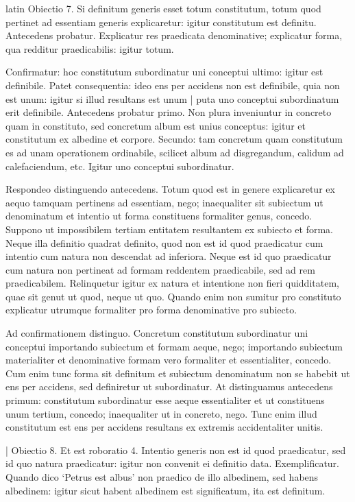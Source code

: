 \begin{otherlanguage*}{latin}
\pstart
  Obiectio 7. Si definitum generis esset totum constitutum, totum quod pertinet ad essentiam generis explicaretur: igitur constitutum est definitu. Antecedens probatur. Explicatur res praedicata denominative; explicatur forma, qua redditur praedicabilis: igitur totum. 
\pend

\pstart
  Confirmatur: hoc constitutum subordinatur uni conceptui ultimo: igitur est definibile. Patet consequentia: ideo ens per accidens non est definibile, quia non est unum: igitur si illud resultans est unum \textnormal{|} puta uno conceptui subordinatum erit definibile. Antecedens probatur primo. Non plura inveniuntur in concreto quam in constituto, sed concretum album est unius conceptus: igitur et constitutum ex albedine et corpore. Secundo: tam concretum quam constitutum es ad unam operationem ordinabile, scilicet album ad disgregandum, calidum ad calefaciendum, etc. Igitur uno conceptui subordinatur. 
\pend

\pstart
  Respondeo distinguendo antecedens. Totum quod est in genere explicaretur ex aequo tamquam pertinens ad essentiam, nego; inaequaliter  sit subiectum ut denominatum et intentio ut forma constituens formaliter genus, concedo. Suppono ut impossibilem tertiam entitatem resultantem ex subiecto et forma. Neque illa definitio quadrat definito, quod non est id quod praedicatur cum intentio cum natura non descendat ad inferiora. Neque est id quo praedicatur cum natura non pertineat ad formam reddentem praedicabile, sed ad rem praedicabilem. Relinquetur igitur ex natura et intentione non fieri quidditatem, quae sit genut ut quod, neque ut quo. Quando enim non sumitur pro constituto explicatur utrumque formaliter pro forma denominative pro subiecto. 
\pend

\pstart
  Ad confirmationem distinguo. Concretum constitutum subordinatur uni conceptui importando subiectum et formam aeque, nego; importando subiectum materialiter et denominative formam vero formaliter et essentialiter, concedo. Cum enim tunc forma sit definitum et subiectum denominatum non se habebit ut ens per accidens, sed definiretur ut subordinatur. At distinguamus antecedens primum: constitutum subordinatur esse aeque essentialiter et ut constituens unum tertium, concedo; inaequaliter ut in concreto, nego. Tunc enim illud constitutum est ens per accidens resultans ex extremis accidentaliter unitis. 
\pend

\pstart
  \textnormal{|}   Obiectio 8. Et est roboratio 4. Intentio generis non est id quod praedicatur, sed id quo natura praedicatur: igitur non convenit ei definitio data. Exemplificatur. Quando dico `Petrus est albus' non praedico de illo albedinem, sed habens albedinem: igitur sicut habent albedinem est significatum, ita est definitum. 
\pend


\end{otherlanguage*}

